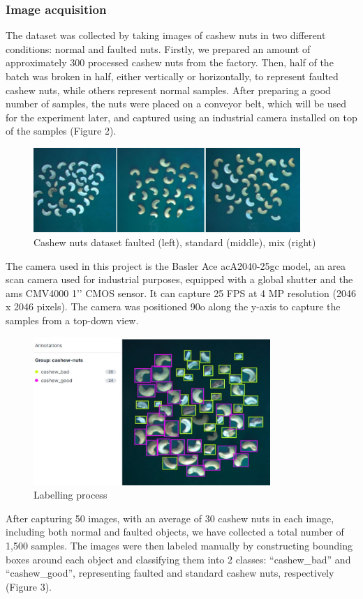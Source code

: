 \documentclass[10pt, letterpaper]{article}
\begin{document}
\subsubsection*{Image acquisition}
    The dataset was collected by taking images of cashew nuts in two different conditions: normal and faulted nuts. Firstly, we prepared an amount of approximately 300 processed cashew nuts from the factory. Then, half of the batch was broken in half, either vertically or horizontally, to represent faulted cashew nuts, while others represent normal samples. After preparing a good number of samples, the nuts were placed on a conveyor belt, which will be used for the experiment later, and captured using an industrial camera installed on top of the samples (Figure 2).\par
    \begin{figure}[h]
        \centering
        \includegraphics[width=0.9\textwidth]{fig2.JPG}
        \caption{Cashew nuts dataset faulted (left), standard (middle), mix (right)}
    \end{figure}
    The camera used in this project is the Basler Ace acA2040-25gc model, an area scan camera used for industrial purposes, equipped with a global shutter and the ams CMV4000 1’’ CMOS sensor. It can capture 25 FPS at 4 MP resolution (2046 x 2046 pixels). The camera was positioned 90o along the y-axis to capture the samples from a top-down view.\par
    \begin{figure}[h]
        \centering
        \includegraphics[width=0.8\textwidth]{fig3.JPG}
        \caption{Labelling process}
    \end{figure}
    After capturing 50 images, with an average of 30 cashew nuts in each image, including both normal and faulted objects, we have collected a total number of 1,500 samples. The images were then labeled manually by constructing bounding boxes around each object and classifying them into 2 classes: “cashew\_bad” and “cashew\_good”, representing faulted and standard cashew nuts, respectively (Figure 3).\par
\end{document}
